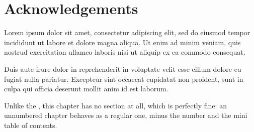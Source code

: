 \chapter*[acknowledgements]{Acknowledgements}

Lorem ipsum dolor sit amet, consectetur adipiscing elit, sed do eiusmod tempor incididunt ut labore et dolore magna aliqua.
Ut enim ad minim veniam, quis nostrud exercitation ullamco laboris nisi ut aliquip ex ea commodo consequat.

Duis aute irure dolor in reprehenderit in voluptate velit esse cillum dolore eu fugiat nulla pariatur.
Excepteur sint occaecat cupidatat non proident, sunt in culpa qui officia deserunt mollit anim id est laborum.

Unlike the , this chapter has no section at all, which is perfectly fine: an unnumbered chapter behaves as a regular one, minus the number and the mini table of contents.
